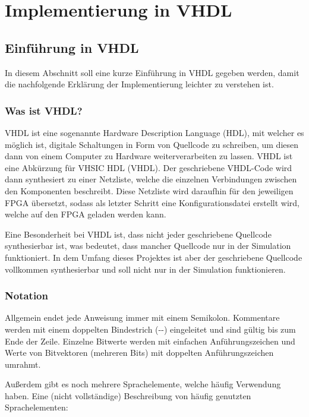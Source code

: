 \chapter{Implementierung in VHDL}
\label{c:vhdl}
\section{Einführung in VHDL}
In diesem Abschnitt soll eine kurze Einführung in VHDL gegeben werden, damit die
nachfolgende Erklärung der Implementierung leichter zu verstehen ist.

\subsection{Was ist VHDL?}
VHDL ist eine sogenannte Hardware Description Language (HDL), mit welcher es
möglich ist, digitale Schaltungen in Form von Quellcode zu schreiben, um diesen
dann von einem Computer zu Hardware weiterverarbeiten zu lassen. VHDL ist eine
Abkürzung für VHSIC HDL (\acl{VHDL}). Der geschriebene VHDL-Code wird dann
synthesiert zu einer Netzliste, welche die einzelnen Verbindungen zwischen den
Komponenten beschreibt. Diese Netzliste wird daraufhin für den jeweiligen
\ac{FPGA} übersetzt, sodass als letzter Schritt eine Konfigurationsdatei
erstellt wird, welche auf den \ac{FPGA} geladen werden kann.

Eine Besonderheit bei VHDL ist, dass nicht jeder geschriebene Quellcode
synthesierbar ist, was bedeutet, dass mancher Quellcode nur in der Simulation
funktioniert. In dem Umfang dieses Projektes ist aber der geschriebene Quellcode
vollkommen synthesierbar und soll nicht nur in der Simulation funktionieren.

\subsection{Notation}
Allgemein endet jede Anweisung immer mit einem Semikolon. Kommentare werden mit
einem doppelten Bindestrich (-{}-) eingeleitet und sind gültig bis zum Ende der
Zeile. Einzelne Bitwerte werden mit einfachen Anführungszeichen und Werte
von Bitvektoren (mehreren Bits) mit doppelten Anführungszeichen umrahmt.

Außerdem gibt es noch mehrere Sprachelemente, welche häufig Verwendung
haben. Eine (nicht vollständige) Beschreibung von häufig genutzten
Sprachelementen:

